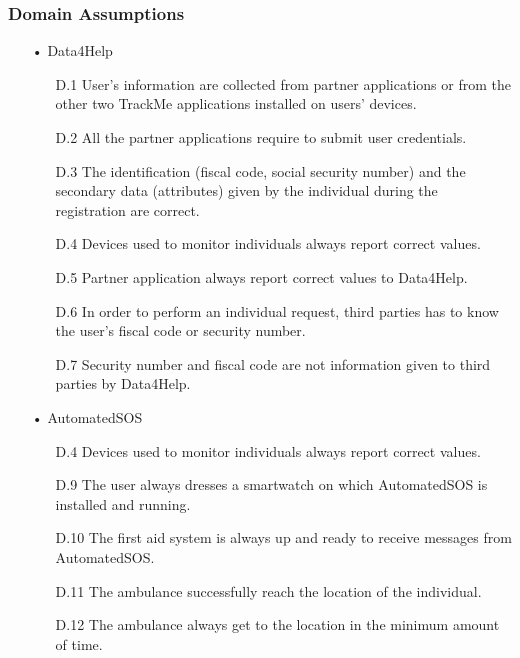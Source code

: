 \subsubsection{Domain Assumptions}
\begin{enumerate}

\item[•] {\Large Data4Help}
	\begin{enumerate}
	\item [D.1] User's information are collected from partner applications or from the other two TrackMe applications installed on users' devices.
	\item [D.2] All the partner applications require to submit user credentials.
	\item [D.3] The identification (fiscal code, social security number) and the secondary data (attributes) given by the individual during the registration are correct.
    \item [D.4] Devices used to monitor individuals always report correct values.
    \item [D.5] Partner application always report correct values to Data4Help.
	\item [D.6] In order to perform an individual request, third parties has to know the user's fiscal code or security number.
	\item [D.7] Security number and fiscal code are not information given to third parties by Data4Help.
	\end{enumerate}
	
\item[•] {\Large AutomatedSOS}
	\begin{enumerate}
	\item [D.4] Devices used to monitor individuals always report correct values.
	\item [D.9] The user always dresses a smartwatch on which AutomatedSOS is installed and running.    
	\item [D.10] The first aid system is always up and ready to receive messages from AutomatedSOS.
    \item [D.11] The ambulance successfully reach the location of the individual.
    \item [D.12] The ambulance always get to the location in the minimum amount of time.
    
	\end{enumerate}
	

\end{enumerate}
